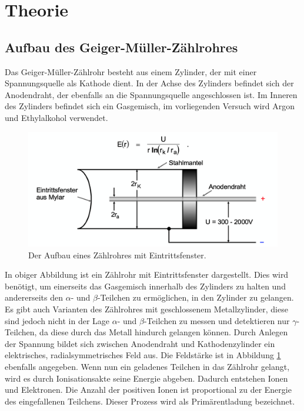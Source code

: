 \section{Theorie}
  \subsection{Aufbau des Geiger-Müller-Zählrohres}
    Das Geiger-Müller-Zählrohr besteht aus einem Zylinder, der mit einer Spannungsquelle als
    Kathode dient. In der Achse des Zylinders befindet sich der Anodendraht, der ebenfalls an die
    Spannungsquelle angeschlossen ist. Im Inneren des Zylinders befindet sich ein Gasgemisch,
    im vorliegenden Versuch wird Argon und Ethylalkohol verwendet.
    \begin{figure}[H]
      \centering
        \includegraphics[scale=0.4]{content/AufbauGMZ.png}
        \caption{Der Aufbau eines Zählrohres mit Eintrittsfenster.}
        \label{fig:aufbau1}
    \end{figure}
    \noindent
    In obiger Abbildung ist ein Zählrohr mit Eintrittsfenster dargestellt. Dies wird benötigt,
    um einerseits das Gasgemisch innerhalb des Zylinders zu halten und andererseits den
    $\alpha$- und $\beta$-Teilchen zu ermöglichen, in den Zylinder zu gelangen. Es gibt auch
    Varianten des Zählrohres mit geschlossenem Metallzylinder, diese sind jedoch nicht in der Lage
    $\alpha$- und $\beta$-Teilchen zu messen und detektieren nur $\gamma$-Teilchen, da diese durch das
    Metall hindurch gelangen können.
    Durch Anlegen der Spannung bildet sich zwischen Anodendraht und Kathodenzylinder ein elektrisches,
    radialsymmetrisches Feld aus. Die Feldstärke ist in Abbildung \ref{fig:aufbau1} ebenfalls
    angegeben. Wenn nun ein geladenes Teilchen in das Zählrohr gelangt, wird es durch Ionisationsakte
    seine Energie abgeben. Dadurch entstehen Ionen und Elektronen. Die Anzahl der positiven Ionen ist
    proportional zu der Energie des eingefallenen Teilchens. Dieser Prozess wird als Primärentladung
    bezeichnet.
